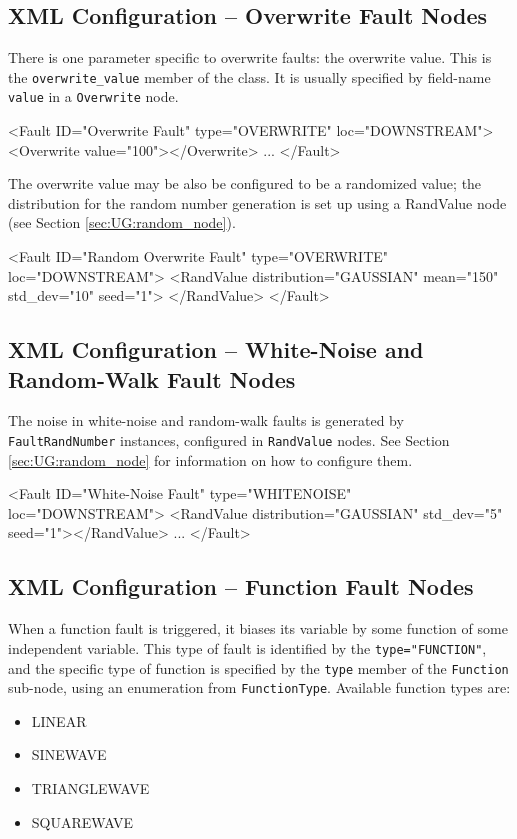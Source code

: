\documentclass[11pt,fleqn]{report}
\begin{document}
\subsection{XML Configuration -- Overwrite Fault Nodes}
\par There is one parameter specific to overwrite faults: the overwrite value.
This is the \linebreak \verb"overwrite_value" member of the class.
It is usually specified by field-name \verb'value' in a \verb'Overwrite' node.

\begin{codeXML}
<Fault ID="Overwrite Fault" type="OVERWRITE" loc="DOWNSTREAM">
  <Overwrite value="100"></Overwrite>
  ...
</Fault>
\end{codeXML}

The overwrite value may be also be configured to be a randomized value;
the distribution for the random number generation is
set up using a RandValue node (see Section \ref{sec:UG:random_node}).
\begin{codeXML}
<Fault ID="Random Overwrite Fault" type="OVERWRITE" loc="DOWNSTREAM">
  <RandValue distribution="GAUSSIAN" mean="150" std_dev="10" seed="1">
  </RandValue>
</Fault>
\end{codeXML}

\subsection{XML Configuration -- White-Noise and Random-Walk Fault Nodes}
\par The noise in white-noise and random-walk faults is generated by
\verb"FaultRandNumber" instances, configured in \verb'RandValue' nodes.
See Section \ref{sec:UG:random_node} for information on how to configure them.
\begin{codeXML}
<Fault ID="White-Noise Fault" type="WHITENOISE" loc="DOWNSTREAM">
  <RandValue distribution="GAUSSIAN" std_dev="5" seed="1"></RandValue>
  ...
</Fault>
\end{codeXML}

\subsection{XML Configuration -- Function Fault Nodes}
When a function fault is triggered, it biases its variable by some function
of some independent variable. This type of fault is identified by the
\verb'type="FUNCTION"', and the specific type of function is specified by the
\verb"type" member of the \verb'Function' sub-node, using an enumeration from
\verb"FunctionType". Available function types are:
\begin{itemize}
 \item LINEAR
 \item SINEWAVE
 \item TRIANGLEWAVE
 \item SQUAREWAVE
\end{itemize}
\end{document}
